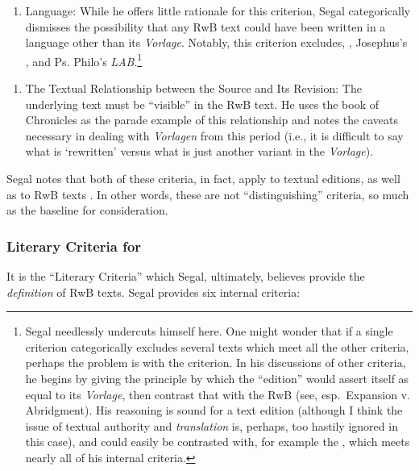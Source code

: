 \begin{enumerate}
\def\labelenumi{\arabic{enumi}.}
\tightlist
\item
  Language: While he offers little rationale for this criterion, Segal
  categorically dismisses the possibility that any RwB text could have
  been written in a language other than its \emph{Vorlage}. Notably,
  this criterion excludes, \ga, Josephus's
  \ant, and Ps. Philo's \emph{LAB}.\footnote{Segal
    needlessly undercuts himself here. One might wonder that if a single
    criterion categorically excludes several texts which meet all the
    other criteria, perhaps the problem is with the criterion. In his
    discussions of other criteria, he begins by giving the principle by
    which the ``edition'' would assert itself as equal to its
    \emph{Vorlage}, then contrast that with the RwB (see, esp.~Expansion
    v. Abridgment). His reasoning is sound for a text edition (although
    I think the issue of textual authority and \emph{translation} is,
    perhaps, too hastily ignored in this case), and could easily be
    contrasted with, for example the \ga, which meets
    nearly all of his internal criteria.}
\end{enumerate}

\begin{enumerate}
\def\labelenumi{\arabic{enumi}.}
\setcounter{enumi}{1}
\tightlist
\item
  The Textual Relationship between the Source and Its Revision: The
  underlying text must be ``visible'' in the RwB text. He uses the book
  of Chronicles as the parade example of this relationship and notes the
  caveats necessary in dealing with \emph{Vorlagen} from this period
  (i.e., it is difficult to say what is `rewritten' versus what is just
  another variant in the \emph{Vorlage}).
\end{enumerate}

Segal notes that both of these criteria, in fact, apply to textual
editions, as well as to RwB texts \autocite[20]{segal_henze2005}. In
other words, these are not ``distinguishing'' criteria, so much as the
baseline for consideration.

\hypertarget{literary-criteria-for-rwb}{%
\subsubsection{Literary Criteria for
\RWB}\label{literary-criteria-for-rwb}}

It is the ``Literary Criteria'' which Segal, ultimately, believes
provide the \emph{definition} of RwB
texts.\autocite[20]{segal_henze2005} Segal provides six internal
criteria:

